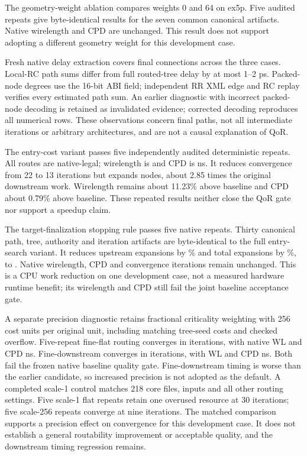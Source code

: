 \documentclass[10pt]{article}
\begin{document}
The geometry-weight ablation compares weights 0 and 64 on ex5p. Five audited
repeats give byte-identical results for the seven common canonical artifacts.
Native wirelength and CPD are unchanged. This result does not support adopting
a different geometry weight for this development case.

Fresh native delay extraction covers \DelayConnections{} final connections
across the three cases. Local-RC path sums differ from full routed-tree delay
by at most 1--2 ps. Packed-node degrees use the 16-bit ABI field; independent
RR XML edge and RC replay verifies every estimated path sum. An earlier
diagnostic with incorrect packed-node decoding is retained as invalidated
evidence; corrected decoding reproduces all numerical rows.
These observations concern final paths, not all intermediate
iterations or arbitrary architectures, and are not a causal explanation of QoR.

The entry-cost variant passes five independently audited deterministic repeats.
All routes are native-legal; wirelength is \EntryWL{} and CPD is \EntryCPD{} ns.
It reduces convergence from
22 to 13 iterations but expands \EntryExpanded{} nodes, about 2.85 times the
original downstream work. Wirelength remains about 11.23\% above baseline and
CPD about 0.79\% above baseline. These repeated results neither close the QoR
gate nor support a speedup claim.

The target-finalization stopping rule passes five native repeats. Thirty
canonical path, tree, authority and iteration artifacts are byte-identical to
the full entry-search variant. It reduces upstream expansions by
\StopUpstreamReduction{}\% and total expansions by \StopTotalReduction{}\%,
to \StopExpanded{}. Native wirelength, CPD and convergence iterations remain
unchanged. This is a CPU work reduction on one development case, not a measured
hardware runtime benefit; its wirelength and CPD still fail the joint baseline
acceptance gate.

A separate precision diagnostic retains fractional criticality weighting with
256 cost units per original unit, including matching tree-seed costs and
checked overflow. Five-repeat fine-flat routing converges in
\FineFlatIterations{} iterations, with native WL \FineFlatWL{} and CPD
\FineFlatCPD{} ns. Fine-downstream converges in \FineDownIterations{}
iterations, with WL \FineDownWL{} and CPD \FineDownCPD{} ns. Both fail the
frozen native baseline quality gate. Fine-downstream timing is worse than the
earlier candidate, so increased precision is not adopted as the default.
A completed scale-1 control matches 218 core files, inputs and all other
routing settings. Five scale-1 flat repeats retain one overused resource at
30 iterations; five scale-256 repeats converge at nine iterations. The matched
comparison supports a precision effect on convergence for this development
case. It does not establish a general routability improvement or acceptable
quality, and the downstream timing regression remains.
\end{document}
